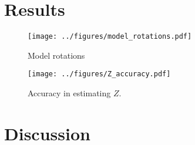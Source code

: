 \documentclass{article} %
\begin{document}
\section{Results}

\begin{figure}[t]
  \centering
  \texttt{[image: ../figures/model\_rotations.pdf]}
  \caption{Model rotations}
  \label{fig:rotations}
\end{figure}

\begin{figure}[t]
  \centering
  \texttt{[image: ../figures/Z\_accuracy.pdf]}
  \caption{Accuracy in estimating $Z$.}
  \label{fig:accuracy}
\end{figure}

\section{Discussion}


\renewcommand\refname{\normalsize{References}}


\end{document}
